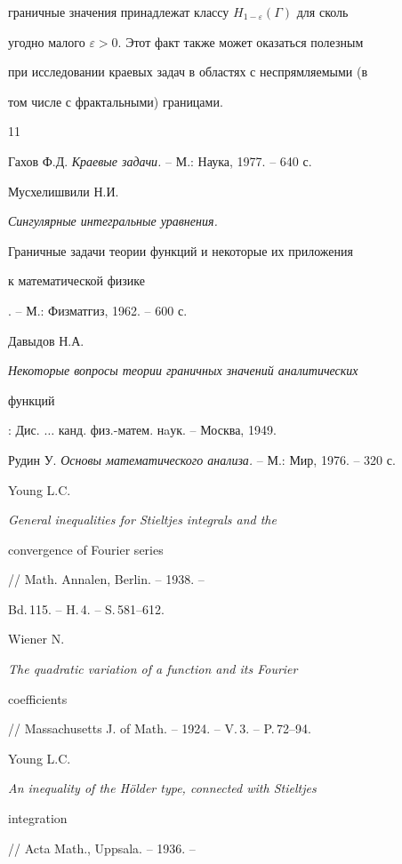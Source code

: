граничные значения принадлежат классу $H_{1-\varepsilon}(\Gamma)$ для сколь


угодно малого $\varepsilon > 0$. Этот факт также может оказаться полезным


при исследовании краевых задач в областях с неспрямляемыми (в


том числе с фрактальными) границами.








\begin{thebibliography}{11}







Гахов Ф.Д. {\it Краевые задачи.} -- М.: Наука, 1977. -- 640 с.




Мусхелишвили Н.И. {\it Сингулярные интегральные уравнения.


Граничные задачи теории функций и некоторые их приложения


к математической физике}. -- М.: Физматгиз, 1962. -- 600 с.




Давыдов Н.А. {\it Некоторые вопросы теории граничных значений аналитических


функций}: Дис. $\dotsc$ канд. физ.-матем. нaук. -- Москва, 1949.




Рудин У. {\it Основы математического анализа.} -- М.: Мир, 1976. -- 320 с.




Young L.C. {\it General inequalities for Stieltjes integrals and the


convergence of Fourier series} // Math. Annalen, Berlin. -- 1938. --


Bd.\,115. -- H.\,4. -- S.\,581--612.




Wiener N. {\it The quadratic variation of a function and its Fourier


coefficients} // Massachusetts J. of Math. -- 1924. -- V.\,3. -- P.\,72--94.




Young L.C. {\it An inequality of the H\"older type, connected with Stieltjes


integration} // Acta Math., Uppsala. -- 1936. --



\end{thebibliography}
